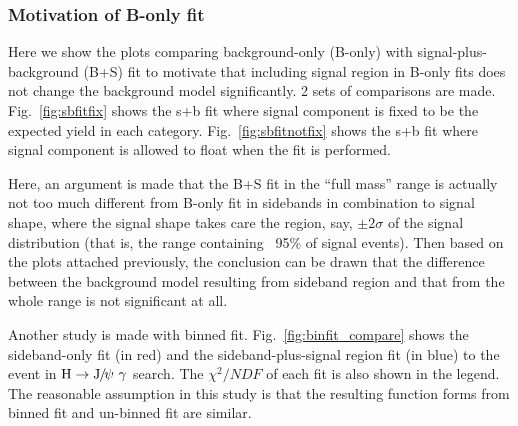 \clearpage		
		
		\subsubsection*{Motivation of B-only fit}
		Here we show the plots comparing background-only (B-only) with signal-plus-background (B+S) fit to motivate that including signal region in B-only fits does not change the background model significantly. 2 sets of comparisons are made. 
		Fig.~\ref{fig:sbfitfix} shows the s+b fit where signal component is fixed to be the expected yield in each category. 
		Fig.~\ref{fig:sbfitnotfix} shows the s+b fit where signal component is allowed to float when the fit is performed.
		
		Here, an argument is made that the B+S fit in the ``full mass'' range is actually not too much different from B-only fit in sidebands in combination to signal shape, where the signal shape takes care the region, say, $\pm 2\sigma$ of the signal distribution (that is, the range containing ~95\% of signal events). Then based on the plots attached previously, the conclusion can be drawn that the difference between the background model resulting from sideband region and that from the whole range is not significant at all.
		
		Another study is made with binned fit. Fig.~\ref{fig:binfit_compare} shows the sideband-only fit (in red) and the sideband-plus-signal region fit (in blue) to the event in $\PH\to\JPsi\ \gamma$ search. The $\chi^{2}/NDF$ of each fit is also shown in the legend. The reasonable assumption in this study is that the resulting function forms from binned fit and un-binned fit are similar.
		
